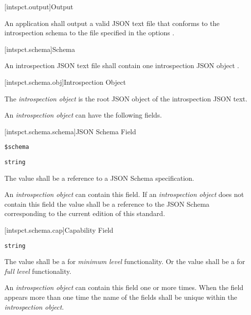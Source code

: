 [intspct.output]{Output}

\pnum
An application shall output a valid JSON text file that conforms to the
introspection schema  to the file specified in the options
.

[intspct.schema]{Schema}

\pnum
An introspection JSON text file shall contain one introspection JSON object
.

[intspct.schema.obj]{Introspection Object}

\pnum
The \emph{introspection object} is the root JSON object of the introspection
JSON text.

\pnum
An \emph{introspection object} can have the following fields.

[intspct.schema.schema]{JSON Schema Field}

\begin{itemdescr}

	\pnum
	\fldname
	\verb|$schema|

	\pnum
	\fldtype
	\verb|string|

	\pnum
	\fldval
	The value shall be a reference to a JSON Schema specification.

	\pnum
	\flddesc
	An \emph{introspection object} can contain this field.
	If an \emph{introspection object} does not contain this field the value
	shall be a reference to the JSON Schema corresponding to the current
	edition of this standard.

\end{itemdescr}

[intspct.schema.cap]{Capability Field}

\begin{itemdescr}

	\pnum
	\fldname
	 

	\pnum
	\fldtype
	\verb|string|

	\pnum
	\fldval
	The value shall be a  for \emph{minimum level}
	functionality.
	Or the value shall be a  for \emph{full level}
	functionality.
  
	\pnum
	\flddesc
	An \emph{introspection object} can contain this field one or more times.
	When the field appears more than one time the name of the fields shall be
	unique within the \emph{introspection object}.
  
\end{itemdescr}

